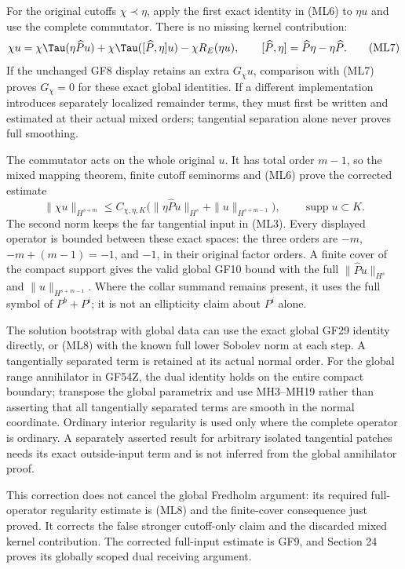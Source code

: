 \documentclass[
  11pt,
]{article}
\begin{document}
For the original cutoffs \(\chi\prec\eta\), apply the first exact
identity in (ML6) to \(\eta u\) and use the complete commutator. There
is no missing kernel contribution: \[
 \chi u=\chi\Tau(\eta\widehat Pu)
          +\chi\Tau([\widehat P,\eta]u)
          -\chi R_E(\eta u),
 \qquad [\widehat P,\eta]=\widehat P\eta-\eta\widehat P.
 \tag{ML7}
\] If the unchanged GF8 display retains an extra \(G_\chi u\),
comparison with (ML7) proves \(G_\chi=0\) for these exact global
identities. If a different implementation introduces separately
localized remainder terms, they must first be written and estimated at
their actual mixed orders; tangential separation alone never proves full
smoothing.

The commutator acts on the whole original \(u\). It has total order
\(m-1\), so the mixed mapping theorem, finite cutoff seminorms and (ML6)
prove the corrected estimate \[
 \|\chi u\|_{H^{s+m}}
 \leq C_{\chi,\eta,K}
       \bigl(\|\eta\widehat Pu\|_{H^s}
                    +\|u\|_{H^{s+m-1}}\bigr),
 \qquad\operatorname{supp}u\subset K.
 \tag{ML8}
\] The second norm keeps the far tangential input in (ML3). Every
displayed operator is bounded between these exact spaces: the three
orders are \(-m\), \(-m+(m-1)=-1\), and \(-1\), in their original factor
orders. A finite cover of the compact support gives the valid global
GF10 bound with the full \(\|\widehat Pu\|_{H^s}\) and
\(\|u\|_{H^{s+m-1}}\). Where the collar summand remains present, it uses
the full symbol of \(P^b+P^i\); it is not an ellipticity claim about
\(P^i\) alone.

The solution bootstrap with global data can use the exact global GF29
identity directly, or (ML8) with the known full lower Sobolev norm at
each step. A tangentially separated term is retained at its actual
normal order. For the global range annihilator in GF54Z, the dual
identity holds on the entire compact boundary; transpose the global
parametrix and use MH3--MH19 rather than asserting that all tangentially
separated terms are smooth in the normal coordinate. Ordinary interior
regularity is used only where the complete operator is ordinary. A
separately asserted result for arbitrary isolated tangential patches
needs its exact outside-input term and is not inferred from the global
annihilator proof.

This correction does not cancel the global Fredholm argument: its
required full-operator regularity estimate is (ML8) and the finite-cover
consequence just proved. It corrects the false stronger cutoff-only
claim and the discarded mixed kernel contribution. The corrected
full-input estimate is GF9, and Section 24 proves its globally scoped
dual receiving argument.
\end{document}
